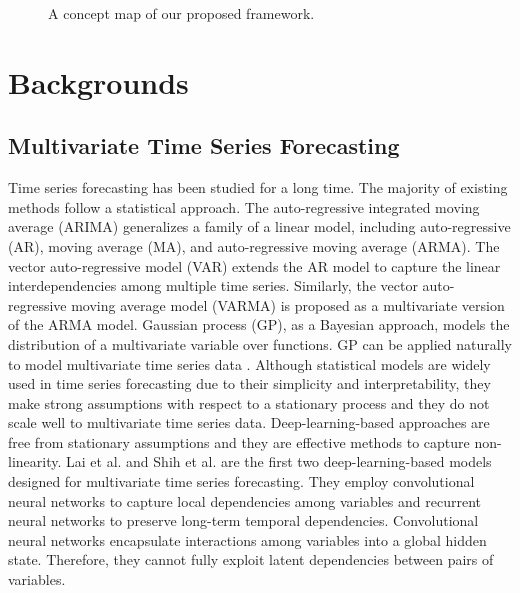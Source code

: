 \documentclass[sigconf]{acmart}
\begin{document}
\begin{figure}
	\centering
	\caption{A concept map of our proposed framework. }
	\label{fig:concept}
\end{figure}


\begin{comment}
\begin{figure}
	\centering
	\scalebox{0.4}{\texttt{[image: FIG/demo.pdf]}}
	\caption{Multivariate time series data viewed from a graph perspective. Each node represents a dynamically changing variable. Each edge represents the hidden dependency relationship between two variables.}
	\label{fig:demo}
\end{figure}
\end{comment}



\section{Backgrounds}
\subsection{Multivariate Time Series Forecasting}
Time series forecasting has been studied for a long time. The majority of existing methods follow a statistical approach. The auto-regressive integrated moving average (ARIMA) \cite{box2015time} generalizes a family of a linear model, including auto-regressive (AR), moving average (MA), and auto-regressive moving average (ARMA). The vector auto-regressive model (VAR) extends the AR model to capture the linear interdependencies among multiple time series. Similarly, the vector auto-regressive moving average model (VARMA) is proposed as a multivariate version of the ARMA model. Gaussian process (GP), as a Bayesian approach, models the distribution of a multivariate variable over functions. GP can be applied naturally to model multivariate time series data \cite{frigola2015bayesian}. Although statistical models are widely used in time series forecasting due to their simplicity and interpretability, they make strong assumptions with respect to a stationary process and they do not scale well to multivariate time series data. Deep-learning-based approaches are free from stationary assumptions and they are effective methods to capture non-linearity. Lai et al. \cite{lai2018modeling} and Shih et al. \cite{shih2019temporal} are the first two deep-learning-based models designed for multivariate time series forecasting. They employ convolutional neural networks to capture local dependencies among variables and recurrent neural networks to preserve long-term temporal dependencies.
Convolutional neural networks encapsulate interactions among variables into a global hidden state. Therefore, they cannot fully exploit latent dependencies between pairs of variables. 
\end{document}
